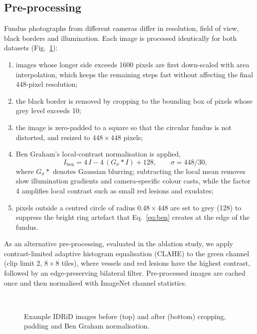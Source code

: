 \subsection{Pre-processing}
Fundus photographs from different cameras differ in resolution, field of view, black borders and illumination. Each
image is processed identically for both datasets (Fig.~\ref{fig:prep}):
\begin{enumerate}
\item images whose longer side exceeds 1600 pixels are first down-scaled with area interpolation, which keeps the
  remaining steps fast without affecting the final $448$-pixel resolution;
\item the black border is removed by cropping to the bounding box of pixels whose grey level exceeds 10;
\item the image is zero-padded to a square so that the circular fundus is not distorted, and resized to
  $448\times448$ pixels;
\item Ben Graham's local-contrast normalisation \citep{graham2015kaggle} is applied,
\begin{equation}
I_{\text{ben}} = 4\,I - 4\,(G_{\sigma} * I) + 128,\qquad \sigma = 448/30,
\label{eq:ben}
\end{equation}
  where $G_\sigma *$ denotes Gaussian blurring; subtracting the local mean removes slow illumination gradients and
  camera-specific colour casts, while the factor 4 amplifies local contrast such as small red lesions and exudates;
\item pixels outside a centred circle of radius $0.48\times448$ are set to grey (128) to suppress the bright ring
  artefact that Eq.~\eqref{eq:ben} creates at the edge of the fundus.
\end{enumerate}
As an alternative pre-processing, evaluated in the ablation study, we apply contrast-limited adaptive histogram
equalisation (CLAHE) \citep{zuiderveld1994contrast} to the green channel (clip limit 2, $8\times8$ tiles), where
vessels and red lesions have the highest contrast, followed by an edge-preserving bilateral filter.
Pre-processed images are cached once and then normalised with ImageNet channel statistics.

\begin{figure}[!t]
\centering
{}\\[2pt]
\caption{Example IDRiD images before (top) and after (bottom) cropping, padding and Ben Graham normalisation.}
\label{fig:prep}
\end{figure}

